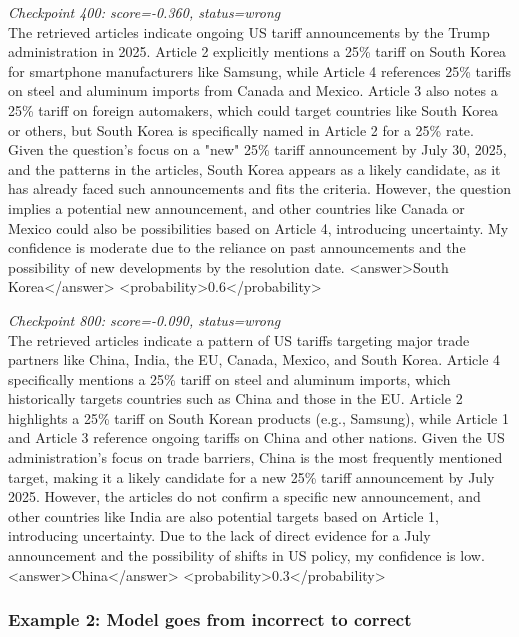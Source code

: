 \documentclass{article} %
\begin{document}
\noindent\textit{Checkpoint 400: score=-0.360, status=wrong}\\
The retrieved articles indicate ongoing US tariff announcements by the Trump administration in 2025. Article 2 explicitly mentions a 25\% tariff on South Korea for smartphone manufacturers like Samsung, while Article 4 references 25\% tariffs on steel and aluminum imports from Canada and Mexico. Article 3 also notes a 25\% tariff on foreign automakers, which could target countries like South Korea or others, but South Korea is specifically named in Article 2 for a 25\% rate. Given the question's focus on a "new" 25\% tariff announcement by July 30, 2025, and the patterns in the articles, South Korea appears as a likely candidate, as it has already faced such announcements and fits the criteria. However, the question implies a potential new announcement, and other countries like Canada or Mexico could also be possibilities based on Article 4, introducing uncertainty. My confidence is moderate due to the reliance on past announcements and the possibility of new developments by the resolution date. <answer>South Korea</answer> <probability>0.6</probability>

\medskip

\noindent\textit{Checkpoint 800: score=-0.090, status=wrong}\\
The retrieved articles indicate a pattern of US tariffs targeting major trade partners like China, India, the EU, Canada, Mexico, and South Korea. Article 4 specifically mentions a 25\% tariff on steel and aluminum imports, which historically targets countries such as China and those in the EU. Article 2 highlights a 25\% tariff on South Korean products (e.g., Samsung), while Article 1 and Article 3 reference ongoing tariffs on China and other nations. Given the US administration's focus on trade barriers, China is the most frequently mentioned target, making it a likely candidate for a new 25\% tariff announcement by July 2025. However, the articles do not confirm a specific new announcement, and other countries like India are also potential targets based on Article 1, introducing uncertainty. Due to the lack of direct evidence for a July announcement and the possibility of shifts in US policy, my confidence is low. <answer>China</answer> <probability>0.3</probability>

\subsubsection{Example 2: Model goes from incorrect to correct}
\end{document}
